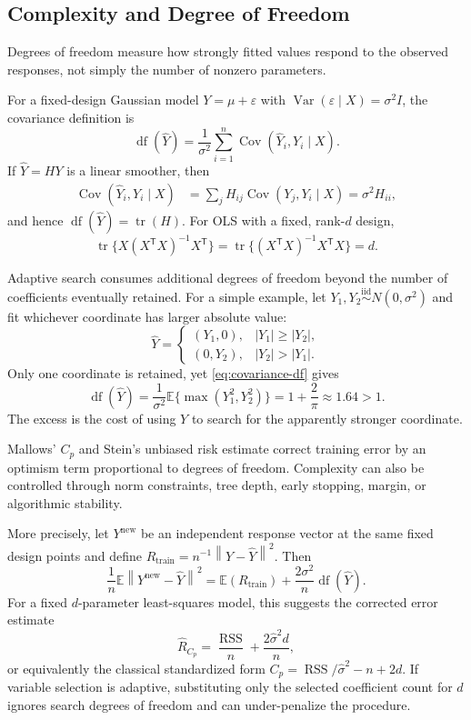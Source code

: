 \documentclass[12pt,oneside]{book}
\numberwithin{equation}{section}
\theoremstyle{definition}
\theoremstyle{plain}
\theoremstyle{remark}
\newcommand{\E}{\mathbb{E}}
\newcommand{\norm}[1]{\left\lVert #1 \right\rVert}
\newcommand{\tr}{\operatorname{tr}}
\begin{document}
\subsection{Complexity and Degree of Freedom}

Degrees of freedom measure how strongly fitted values respond to the observed
responses, not simply the number of nonzero parameters.

For a fixed-design Gaussian model
$Y=\mu+\varepsilon$ with
$\operatorname{Var}(\varepsilon\mid X)=\sigma^2I$, the covariance definition
is
\begin{equation}
 \operatorname{df}(\widehat Y)
 =\frac1{\sigma^2}\sum_{i=1}^n
   \operatorname{Cov}(\widehat Y_i,Y_i\mid X).
 \label{eq:covariance-df}
\end{equation}
If $\widehat Y=HY$ is a linear smoother, then
\begin{align*}
 \operatorname{Cov}(\widehat Y_i,Y_i\mid X)
 &=\sum_jH_{ij}\operatorname{Cov}(Y_j,Y_i\mid X)
 =\sigma^2H_{ii},
\end{align*}
and hence $\operatorname{df}(\widehat Y)=\tr(H)$. For OLS with a fixed,
rank-$d$ design,
\[
 \tr\{X(X^\mathsf TX)^{-1}X^\mathsf T\}
 =\tr\{(X^\mathsf TX)^{-1}X^\mathsf TX\}=d.
\]

Adaptive search consumes additional degrees of freedom beyond the number of
coefficients eventually retained. For a simple example, let
$Y_1,Y_2\overset{\mathrm{iid}}{\sim}N(0,\sigma^2)$ and fit whichever coordinate
has larger absolute value:
\[
 \widehat Y=
 \begin{cases}
  (Y_1,0),&|Y_1|\geq|Y_2|,\\
  (0,Y_2),&|Y_2|>|Y_1|.
 \end{cases}
\]
Only one coordinate is retained, yet \cref{eq:covariance-df} gives
\[
 \operatorname{df}(\widehat Y)
 =\frac1{\sigma^2}\E\{\max(Y_1^2,Y_2^2)\}
 =1+\frac2\pi\approx1.64>1.
\]
The excess is the cost of using $Y$ to search for the apparently stronger
coordinate.

Mallows' $C_p$ and Stein's unbiased risk estimate correct training error by an
optimism term proportional to degrees of freedom. Complexity can also be
controlled through norm constraints, tree depth, early stopping, margin, or
algorithmic stability.

More precisely, let $Y^{\mathrm{new}}$ be an independent response vector at
the same fixed design points and define
$R_{\mathrm{train}}=n^{-1}\norm{Y-\widehat Y}^2$. Then
\begin{equation}
 \frac1n\E\norm{Y^{\mathrm{new}}-\widehat Y}^2
 =\E(R_{\mathrm{train}})
  +\frac{2\sigma^2}{n}\operatorname{df}(\widehat Y).
 \label{eq:optimism-df}
\end{equation}
For a fixed $d$-parameter least-squares model, this suggests the corrected
error estimate
\[
 \widehat R_{C_p}=\frac{\operatorname{RSS}}n+\frac{2\widehat\sigma^2d}{n},
\]
or equivalently the classical standardized form
$C_p=\operatorname{RSS}/\widehat\sigma^2-n+2d$. If variable selection is
adaptive, substituting only the selected coefficient count for $d$ ignores
search degrees of freedom and can under-penalize the procedure.
\end{document}

